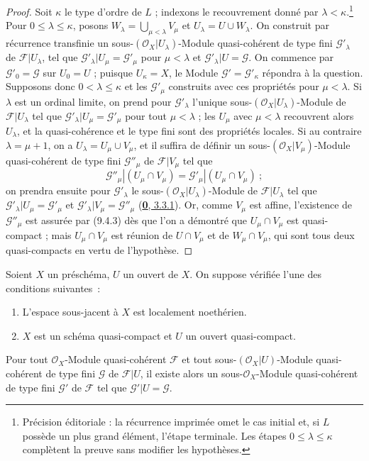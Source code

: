 \begin{proof}
Soit $\kappa$ le type d'ordre de $L$ ; indexons le recouvrement donné par $\lambda<\kappa$.\footnote{Précision éditoriale : la récurrence imprimée omet le cas initial et, si $L$ possède un plus grand élément, l'étape terminale. Les étapes $0\leq\lambda\leq\kappa$ complètent la preuve sans modifier les hypothèses.}
Pour $0\leq\lambda\leq\kappa$, posons $W_\lambda=\bigcup_{\mu<\lambda}V_\mu$ et $U_\lambda=U\cup W_\lambda$.
On construit par récurrence transfinie un sous-$(\mathscr{O}_X|U_\lambda)$-Module quasi-cohérent de type fini $\mathscr{G}'_\lambda$ de $\mathscr{F}|U_\lambda$, tel que $\mathscr{G}'_\lambda|U_\mu=\mathscr{G}'_\mu$ pour $\mu<\lambda$ et $\mathscr{G}'_\lambda|U=\mathscr{G}$.
On commence par $\mathscr{G}'_0=\mathscr{G}$ sur $U_0=U$ ; puisque $U_\kappa=X$, le Module $\mathscr{G}'=\mathscr{G}'_\kappa$ répondra à la question.
Supposons donc $0<\lambda\leq\kappa$ et les $\mathscr{G}'_\mu$ construits avec ces propriétés pour $\mu<\lambda$.
Si $\lambda$ est un ordinal limite, on prend pour $\mathscr{G}'_\lambda$ l'unique sous-$(\mathscr{O}_X|U_\lambda)$-Module de $\mathscr{F}|U_\lambda$ tel que $\mathscr{G}'_\lambda|U_\mu=\mathscr{G}'_\mu$ pour tout $\mu<\lambda$ ; les $U_\mu$ avec $\mu<\lambda$ recouvrent alors $U_\lambda$, et la quasi-cohérence et le type fini sont des propriétés locales.
Si au contraire $\lambda=\mu+1$, on a $U_\lambda=U_\mu\cup V_\mu$, et il suffira de définir un
sous-$(\mathscr{O}_X|V_\mu)$-Module quasi-cohérent de type fini
$\mathscr{G}''_\mu$ de $\mathscr{F}|V_\mu$ tel que
\[
  \mathscr{G}''_\mu|(U_\mu\cap V_\mu)
  =\mathscr{G}'_\mu|(U_\mu\cap V_\mu)~;
\]
on prendra ensuite pour $\mathscr{G}'_\lambda$ le
sous-$(\mathscr{O}_X|U_\lambda)$-Module de $\mathscr{F}|U_\lambda$ tel que
$\mathscr{G}'_\lambda|U_\mu=\mathscr{G}'_\mu$ et
$\mathscr{G}'_\lambda|V_\mu=\mathscr{G}''_\mu$
(\hyperref[0.3.3.1-fr]{\textbf{0}, 3.3.1}). Or, comme $V_\mu$ est affine, l'existence
de $\mathscr{G}''_\mu$ est assurée par (9.4.3) dès que l'on a démontré que
$U_\mu\cap V_\mu$ est quasi-compact ; mais $U_\mu\cap V_\mu$ est réunion de
$U\cap V_\mu$ et de $W_\mu\cap V_\mu$, qui sont tous deux quasi-compacts en
vertu de l'hypothèse.
\end{proof}

\begin{theorem}[9.4.7]
\label{I.9.4.7-fr}
Soient $X$ un préschéma, $U$ un ouvert de $X$. On suppose vérifiée l'une des
conditions suivantes~:
\begin{enumerate}
  \item[\textup{a)}] L'espace sous-jacent à $X$ est localement noethérien.
  \item[\textup{b)}] $X$ est un schéma quasi-compact et $U$ un ouvert quasi-compact.
\end{enumerate}
Pour tout $\mathscr{O}_X$-Module quasi-cohérent $\mathscr{F}$ et tout
sous-$(\mathscr{O}_X|U)$-Module quasi-cohérent \textup{de type fini} $\mathscr{G}$ de
$\mathscr{F}|U$, il existe alors un sous-$\mathscr{O}_X$-Module
quasi-cohérent \textup{de type fini} $\mathscr{G}'$ de $\mathscr{F}$ tel que
$\mathscr{G}'|U=\mathscr{G}$.
\end{theorem}

